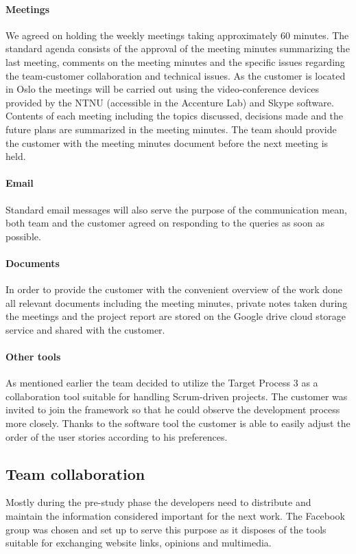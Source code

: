 \paragraph{Meetings}
We agreed on holding the weekly meetings taking approximately 60 minutes. The standard agenda consists of the approval of the meeting minutes summarizing the last meeting, comments on the meeting minutes and the specific issues regarding the team-customer collaboration and technical issues. As the customer is located in Oslo the meetings will be carried out using the video-conference devices provided by the NTNU (accessible in the Accenture Lab) and Skype software. Contents of each meeting including the topics discussed, decisions made and the future plans are summarized in the meeting minutes. The team should provide the customer with the meeting minutes document before the next meeting is held.

\paragraph{Email}
Standard email messages will also serve the purpose of the communication mean, both team and the customer agreed on responding to the queries as soon as possible.

\paragraph{Documents}
In order to provide the customer with the convenient overview of the work done all relevant documents including the meeting minutes, private notes taken during the meetings and the project report are stored on the Google drive cloud storage service and shared with the customer.

\paragraph{Other tools}
As mentioned earlier the team decided to utilize the Target Process 3 as a collaboration tool suitable for handling Scrum-driven projects. The customer was invited to join the framework so that he could observe the development process more closely. Thanks to the software tool the customer is able to easily adjust the order of the user stories according to his preferences.

\subsection{Team collaboration}
Mostly during the pre-study phase the developers need to distribute and maintain the information considered important for the next work. The Facebook group was chosen and set up to serve this purpose as it disposes of the tools suitable for exchanging website links, opinions and multimedia.

